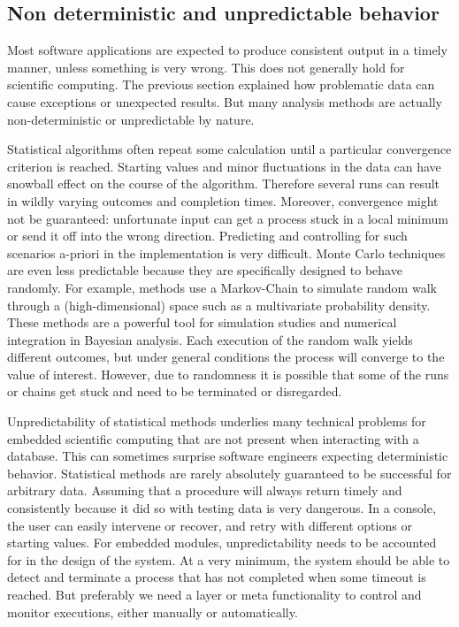 \subsection{Non deterministic and unpredictable behavior}

Most software applications are expected to produce consistent output in a timely manner, unless something is very wrong. This does not generally hold for scientific computing. The previous section explained how problematic data can cause exceptions or unexpected results. But many analysis methods are actually non-deterministic or unpredictable by nature.

Statistical algorithms often repeat some calculation until a particular convergence criterion is reached. Starting values and minor fluctuations in the data can have snowball effect on the course of the algorithm. Therefore several runs can result in wildly varying outcomes and completion times. Moreover, convergence might not be guaranteed: unfortunate input can get a process stuck in a local minimum or send it off into the wrong direction. Predicting and controlling for such scenarios a-priori in the implementation is very difficult. Monte Carlo techniques are even less predictable because they are specifically designed to behave randomly. For example, \MCMC methods use a Markov-Chain to simulate random walk through a (high-dimensional) space such as a multivariate probability density. These methods are a powerful tool for simulation studies and numerical integration in Bayesian analysis. Each execution of the random walk yields different outcomes, but under general conditions the process will converge to the value of interest. However, due to randomness it is possible that some of the runs or chains get stuck and need to be terminated or disregarded.

Unpredictability of statistical methods underlies many technical problems for embedded scientific computing that are not present when interacting with a database. This can sometimes surprise software engineers expecting deterministic behavior. Statistical methods are rarely absolutely guaranteed to be successful for arbitrary data. Assuming that a procedure will always return timely and consistently because it did so with testing data is very dangerous. In a console, the user can easily intervene or recover, and retry with different options or starting values. For embedded modules, unpredictability needs to be accounted for in the design of the system. At a very minimum, the system should be able to detect and terminate a process that has not completed when some timeout is reached. But preferably we need a layer or meta functionality to control and monitor executions, either manually or automatically. 

